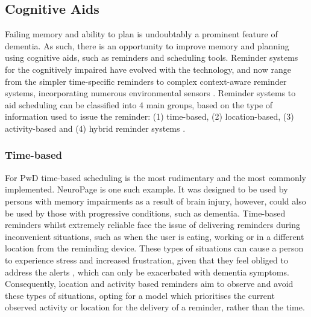 \subsection{Cognitive Aids}
Failing memory and ability to plan is undoubtably a prominent feature of dementia. As such, there is an opportunity to improve memory and planning using cognitive aids, such as reminders and scheduling tools. Reminder systems for the cognitively impaired have evolved with the technology, and now range from the simpler time-specific reminders to complex context-aware reminder systems, incorporating numerous environmental sensors \cite{Hersh1994, Zhang2008, Zhou2012}. Reminder systems to aid scheduling can be classified into 4 main groups, based on the type of information used to issue the reminder: (1) time-based, (2) location-based, (3) activity-based and (4) hybrid reminder systems \cite{Seelye2012, Hartin2014-IWAAL}.

\subsubsection{Time-based}
For PwD time-based scheduling is the most rudimentary and the most commonly implemented. NeuroPage \cite{Hersh1994, Wilson1997} is one such example. It was designed to be used by persons with memory impairments as a result of brain injury, however, could also be used by those with progressive conditions, such as dementia. Time-based reminders whilst extremely reliable face the issue of delivering reminders during inconvenient situations, such as when the user is eating, working or in a different location from the reminding device. These types of situations can cause a person to experience stress and increased frustration, given that they feel obliged to address the alerts \cite{Mark2008}, which can only be exacerbated with dementia symptoms.
Consequently, location and activity based reminders aim to observe and avoid these types of situations, opting for a model which prioritises the current observed activity or location for the delivery of a reminder, rather than the time.

